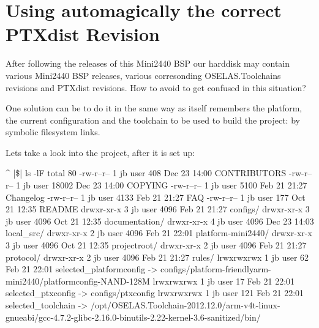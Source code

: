 %
%
%
%
%
%
%

\section{Using automagically the correct PTXdist Revision}	\label{sec:ptxdistreleases}

After following the releases of this Mini2440 BSP our harddisk may contain
various Mini2440 BSP releases, various corresonding OSELAS.Toolchains revisions
and PTXdist revisions. How to avoid to get confused in this situation?

One solution can be to do it in the same way as \ptxdist{} itself remembers the
platform, the current configuration and the toolchain to be used to build the
project: by symbolic filesystem links.

Lets take a look into the project, after it is set up:

\begin{ptxshell}[escapechar=|]{^}
|\$| ls -lF
total 80
-rw-r--r-- 1 jb user   408 Dec 23 14:00 CONTRIBUTORS
-rw-r--r-- 1 jb user 18002 Dec 23 14:00 COPYING
-rw-r--r-- 1 jb user  5100 Feb 21 21:27 Changelog
-rw-r--r-- 1 jb user  4133 Feb 21 21:27 FAQ
-rw-r--r-- 1 jb user   177 Oct 21 12:35 README
drwxr-xr-x 3 jb user  4096 Feb 21 21:27 configs/
drwxr-xr-x 3 jb user  4096 Oct 21 12:35 documentation/
drwxr-xr-x 4 jb user  4096 Dec 23 14:03 local_src/
drwxr-xr-x 2 jb user  4096 Feb 21 22:01 platform-mini2440/
drwxr-xr-x 3 jb user  4096 Oct 21 12:35 projectroot/
drwxr-xr-x 2 jb user  4096 Feb 21 21:27 protocol/
drwxr-xr-x 2 jb user  4096 Feb 21 21:27 rules/
lrwxrwxrwx 1 jb user    62 Feb 21 22:01 selected_platformconfig -> configs/platform-friendlyarm-mini2440/platformconfig-NAND-128M
lrwxrwxrwx 1 jb user    17 Feb 21 22:01 selected_ptxconfig -> configs/ptxconfig
lrwxrwxrwx 1 jb user   121 Feb 21 22:01 selected_toolchain -> /opt/OSELAS.Toolchain-2012.12.0/arm-v4t-linux-gnueabi/gcc-4.7.2-glibc-2.16.0-binutils-2.22-kernel-3.6-sanitized/bin/
\end{ptxshell}

